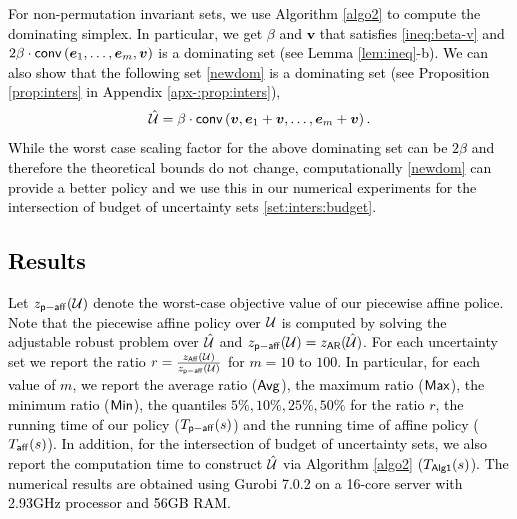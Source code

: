 \documentclass[11pt]{article}
\theoremstyle{plain}
\theoremstyle{definition}
\numberwithin{equation}{section}%
\numberwithin{equation}{section}%
\newcommand{\mb}[1]{\ensuremath{\boldsymbol{#1}}}
\newcommand*{\red}{\textcolor{black}}
\begin{document}
\red{
For non-permutation invariant sets, we use Algorithm \ref{algo2} to compute the dominating simplex. In particular, we get $\beta$ and $\mb v$ that satisfies \eqref{ineq:beta-v}
and  $2 \beta \cdot {\sf conv } \left( \mb e_1,\ldots,\mb e_m, \mb v \right)$ is a dominating set (see Lemma \ref{lem:ineq}-b). We can also show that the following set \eqref{newdom} is a dominating set (see Proposition \ref{prop:inters} in Appendix \ref{apx-:prop:inters}),
\begin{equation} \label{newdom}
{\hat{\cal U}} = \beta \cdot {\sf conv} \left( \mb v, \mb e_1 + \mb v, \ldots, \mb e_m + \mb v \right).
\end{equation}
While the worst case scaling factor for the above dominating set can be $2 \beta$ and therefore the theoretical bounds do not change, computationally \eqref{newdom} can provide a better policy and we use this in our numerical experiments for the intersection of budget of uncertainty sets  \eqref{set:inters:budget}.
}

\red{
\subsection{Results}
Let $z_{\sf p-aff}({\cal U})$ denote the worst-case objective value of our piecewise affine police. Note that  the piecewise affine policy over ${\cal U}$ is computed by solving the adjustable robust problem over $\hat{\cal U}$ and $z_{\sf p-aff}({\cal U}) = z_{\sf AR}(\hat{\cal U})$. For each uncertainty set we report the ratio $r =  \frac{z_{\sf{Aff}} ({\cal U})    }{z_{\sf p-aff}  ({\cal U}) }$ for $m=10$ to $100$. In particular, for each value of $m$, we report the average ratio (${\sf Avg}$), the maximum ratio  (${\sf Max}$), the minimum ratio (${\sf Min}$), the quantiles $5\%, 10\% , 25\%, 50\% $ for the ratio $r$, the running time of our policy ($T_{\sf p-aff}(s)$) and the running time of affine policy ($T_{\sf aff}(s)$). In addition, for the intersection of budget of uncertainty sets, we also report the computation time to construct $\hat{\cal U}$ via Algorithm \ref{algo2} ($T_{\sf Alg1}(s)$).  The numerical results are obtained using Gurobi 7.0.2 on a 16-core server with 2.93GHz processor and 56GB RAM.}

\end{document}
